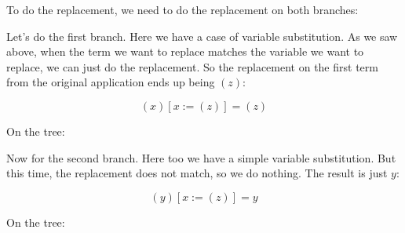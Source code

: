 \documentclass{book}
\numberwithin{equation}{chapter}
\begin{document}
\noindent
To do the replacement, we need to do the replacement on both branches:

\begin{center}
\end{center}

\noindent
Let's do the first branch. Here we have a case of variable substitution. As we saw above, when the term we want to replace matches the variable we want to replace, we can just do the replacement. So the replacement on the first term from the original application ends up being $(z)$:

\begin{equation}
(x)[x := (z)] = (z)
\end{equation}

\noindent
On the tree:

\begin{center}
\end{center}

\noindent
Now for the second branch. Here too we have a simple variable substitution. But this time, the replacement does not match, so we do nothing. The result is just $y$:

\begin{equation}
(y)[x := (z)] = y
\end{equation}

\noindent
On the tree:

\begin{center}
\end{center}
\end{document}

